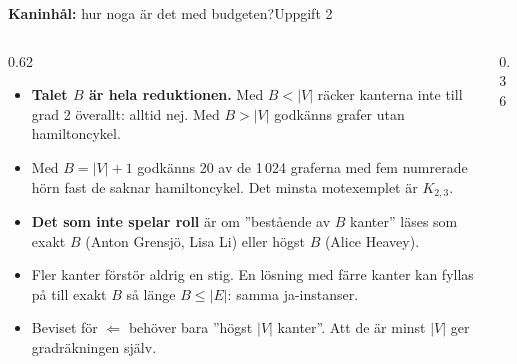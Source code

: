 \documentclass[aspectratio=169,10pt]{beamer}
\newcommand{\rabbit}{\textcolor{warnorange}{\textbf{Kaninhål:}} }
\begin{document}
\begin{frame}{\rabbit hur noga är det med budgeten?}{Uppgift 2}
  \begin{columns}[T]
    \begin{column}{0.62\textwidth}
      \begin{itemize}
        \item<1-> \textbf{Talet $B$ är hela reduktionen.} Med $B<|V|$ räcker kanterna inte till grad 2 överallt: alltid nej. Med $B>|V|$ godkänns grafer utan hamiltoncykel.
        \item<2-> Med $B=|V|+1$ godkänns 20 av de 1\,024 graferna med fem numrerade hörn fast de saknar hamiltoncykel. Det minsta motexemplet är $K_{2,3}$.
        \item<3-> \textbf{Det som inte spelar roll} är om ''bestående av $B$ kanter'' läses som exakt $B$ (Anton Grensjö, Lisa Li) eller högst $B$ (Alice Heavey).
        \item<4-> Fler kanter förstör aldrig en stig. En lösning med färre kanter kan fyllas på till exakt $B$ så länge $B\le|E|$: samma ja-instanser.
        \item<5-> Beviset för $\Leftarrow$ behöver bara ''högst $|V|$ kanter''. Att de är minst $|V|$ ger gradräkningen själv.
      \end{itemize}
    \end{column}
    \begin{column}{0.36\textwidth}
      \centering
    \end{column}
  \end{columns}
\end{frame}
\end{document}
